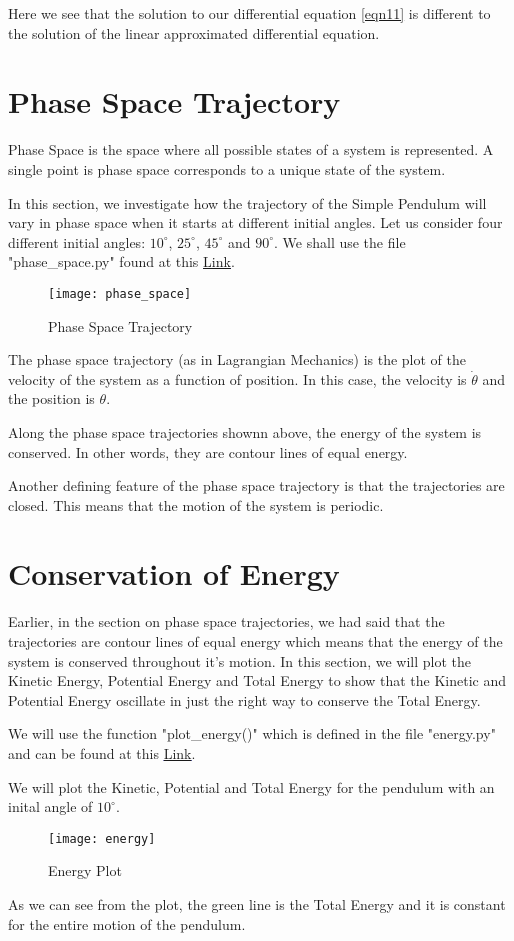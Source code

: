 \documentclass[12pt]{article}
\begin{document}
Here we see that the solution to our differential equation \ref{eqn11} is different to the solution of the linear approximated differential equation.

\section{Phase Space Trajectory}

Phase Space is the space where all possible states of a system is represented. A single point is phase space corresponds to a unique state of the system.

In this section, we investigate how the trajectory of the Simple Pendulum will vary in phase space when it starts at different initial angles.
Let us consider four different initial angles: $10^\circ$, $25^\circ$, $45^\circ$ and $90^\circ$. We shall use the file "phase\_space.py" found at this
\textcolor{blue}{\underline{\href{https://github.com/kkin1995/simulations/phase_space.py}{Link}}}.

\begin{figure}[H]
    \centering
    \caption{Phase Space Trajectory}
    \texttt{[image: phase\_space]}
    \label{fig:phasespace}
\end{figure}

The phase space trajectory (as in Lagrangian Mechanics) is the plot of the velocity of the system as a function of position. In this case, the velocity is
$\dot{\theta}$ and the position is $\theta$.

Along the phase space trajectories shownn above, the energy of the system is conserved. In other words, they are contour lines of equal energy.

Another defining feature of the phase space trajectory is that the trajectories are closed. This means that the motion of the system is periodic.

\section{Conservation of Energy}
Earlier, in the section on phase space trajectories, we had said that the trajectories are contour lines of equal energy which means that the energy of the system is
conserved throughout it's motion. In this section, we will plot the Kinetic Energy, Potential Energy and Total Energy to show that the Kinetic and Potential Energy oscillate
in just the right way to conserve the Total Energy.

We will use the function "plot\_energy()" which is defined in the file "energy.py" and can be found at this
\textcolor{blue}{\underline{\href{https://github.com/kkin1995/simulations/energy.py}{Link}}}.

We will plot the Kinetic, Potential and Total Energy for the pendulum with an inital angle of $10^\circ$.

\begin{figure}[H]
    \centering
    \caption{Energy Plot}
    \texttt{[image: energy]}
    \label{fig:energy}
\end{figure}

As we can see from the plot, the green line is the Total Energy and it is constant for the entire motion of the pendulum.
\end{document}

